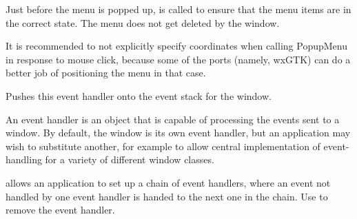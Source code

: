 







Just before the menu is popped up, 
is called to ensure that the menu items are in the correct state. The menu does
not get deleted by the window.

It is recommended to not explicitly specify coordinates when calling PopupMenu
in response to mouse click, because some of the ports (namely, wxGTK) can do
a better job of positioning the menu in that case.



\label{wxwindowpusheventhandler}


Pushes this event handler onto the event stack for the window.




An event handler is an object that is capable of processing the events
sent to a window. By default, the window is its own event handler, but
an application may wish to substitute another, for example to allow
central implementation of event-handling for a variety of different
window classes.

 allows
an application to set up a chain of event handlers, where an event not handled by one event handler is
handed to the next one in the chain. Use  to
remove the event handler.

